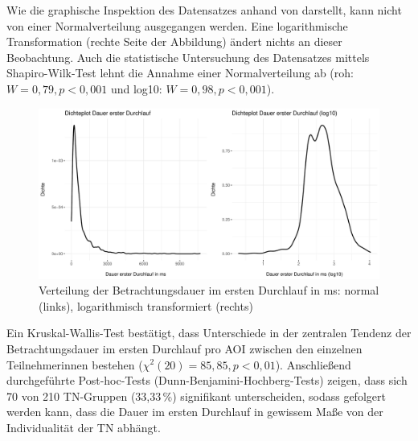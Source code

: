 
Wie die graphische Inspektion des Datensatzes anhand von  darstellt, kann nicht von einer Normalverteilung ausgegangen werden. Eine logarithmische Transformation (rechte Seite der Abbildung) ändert nichts an dieser Beobachtung. Auch die statistische Untersuchung des Datensatzes mittels Shapiro-Wilk-Test lehnt die Annahme einer Normalverteilung ab (roh: $W = 0,79, p < 0,001$ und log10: $W = 0,98, p < 0,001$).



\begin{figure}
    \includegraphics[width=\textwidth]{Figures/EyeTracking/CatDe/ggplot_CatDe-FRDwell_density_de}
	\caption{Verteilung der Betrachtungsdauer im ersten Durchlauf in ms: normal (links), logarithmisch transformiert (rechts)}
	\label{K6:fig:CatDe:IAFRD_density}
\end{figure}


Ein Kruskal-Wallis-Test bestätigt, dass Unterschiede in der zentralen Tendenz der Betrachtungsdauer im ersten Durchlauf pro AOI zwischen den einzelnen Teilnehmer{\textperiodcentered}innen bestehen ($\chi^2(20) = 85,85, p < 0,01$). Anschließend durchgeführte Post-hoc-Tests (Dunn-Benjamini-Hochberg-Tests) zeigen, dass sich 70 von 210 TN-Gruppen (33,33\,\%) signifikant unterscheiden, sodass gefolgert werden kann, dass die Dauer im ersten Durchlauf in gewissem Maße von der Individualität der TN abhängt.

